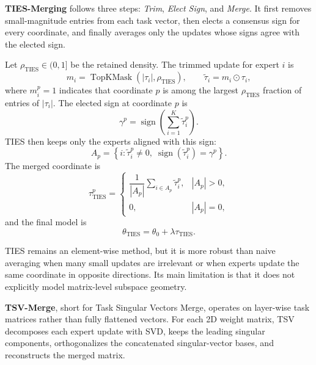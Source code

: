 \documentclass[11pt, a4paper]{utda}
\theoremstyle{plain}
\theoremstyle{definition}
\theoremstyle{remark}
\providecommand{\TIES}{\mathrm{TIES}}
\providecommand{\TopKMask}{\operatorname{TopKMask}}
\providecommand{\sign}{\operatorname{sign}}
\begin{document}
\textbf{TIES-Merging} follows three steps: \emph{Trim}, \emph{Elect Sign}, and
\emph{Merge}. It first removes small-magnitude entries from
each task vector, then elects a consensus sign for every coordinate, and finally
averages only the updates whose signs agree with the elected sign.

Let $\rho_{\mathrm{TIES}}\in(0,1]$ be the retained density. The trimmed update
for expert $i$ is
\begin{equation}
    m_i = \TopKMask(|\tau_i|,\rho_{\mathrm{TIES}}),
    \qquad
    \widetilde{\tau}_i = m_i \odot \tau_i,
\end{equation}
where $m_i^p=1$ indicates that coordinate $p$ is among the largest
$\rho_{\mathrm{TIES}}$ fraction of entries of $|\tau_i|$. The elected sign at
coordinate $p$ is
\begin{equation}
    \gamma^p = \sign\!\left(\sum_{i=1}^{K} \widetilde{\tau}_i^p\right).
\end{equation}
TIES then keeps only the experts aligned with this sign:
\begin{equation}
    A_p = \left\{ i : \widetilde{\tau}_i^p \neq 0,
    \; \sign(\widetilde{\tau}_i^p)=\gamma^p \right\}.
\end{equation}
The merged coordinate is
\begin{equation}
    \tau_{\TIES}^p =
    \begin{cases}
        \dfrac{1}{|A_p|}\sum_{i\in A_p}\widetilde{\tau}_i^p, & |A_p|>0,\\[6pt]
        0, & |A_p|=0,
    \end{cases}
\end{equation}
and the final model is
\begin{equation}
    \theta_{\TIES}=\theta_0+\lambda\tau_{\TIES}.
\end{equation}

TIES remains an element-wise method, but it is more robust than naive averaging
when many small updates are irrelevant or when experts update the same coordinate
in opposite directions. Its main limitation is that it does not explicitly model
matrix-level subspace geometry.

\textbf{TSV-Merge}, short for Task Singular Vectors Merge, operates on layer-wise task matrices rather than fully flattened vectors. For each 2D
weight matrix, TSV decomposes each expert update with SVD, keeps the leading
singular components, orthogonalizes the concatenated singular-vector bases, and
reconstructs the merged matrix.
\end{document}
